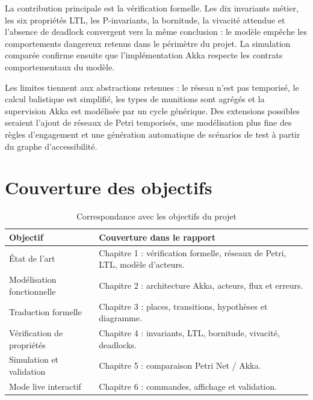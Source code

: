 \documentclass[11pt,a4paper]{report}
\begin{document}
La contribution principale est la vérification formelle. Les dix invariants métier, les six propriétés LTL, les P-invariants, la bornitude, la vivacité attendue et l'absence de deadlock convergent vers la même conclusion : le modèle empêche les comportements dangereux retenus dans le périmètre du projet. La simulation comparée confirme ensuite que l'implémentation Akka respecte les contrats comportementaux du modèle.

Les limites tiennent aux abstractions retenues : le réseau n'est pas temporisé, le calcul balistique est simplifié, les types de munitions sont agrégés et la supervision Akka est modélisée par un cycle générique. Des extensions possibles seraient l'ajout de réseaux de Petri temporisés, une modélisation plus fine des règles d'engagement et une génération automatique de scénarios de test à partir du graphe d'accessibilité.

\appendix
\chapter{Couverture des objectifs}
\begin{table}[H]
\centering
\caption{Correspondance avec les objectifs du projet}
\begin{tabularx}{\textwidth}{lY}
\toprule
Objectif & Couverture dans le rapport \\
\midrule
État de l'art & Chapitre 1 : vérification formelle, réseaux de Petri, LTL, modèle d'acteurs. \\
Modélisation fonctionnelle & Chapitre 2 : architecture Akka, acteurs, flux et erreurs. \\
Traduction formelle & Chapitre 3 : places, transitions, hypothèses et diagramme. \\
Vérification de propriétés & Chapitre 4 : invariants, LTL, bornitude, vivacité, deadlocks. \\
Simulation et validation & Chapitre 5 : comparaison Petri Net / Akka. \\
Mode live interactif & Chapitre 6 : commandes, affichage et validation. \\
\bottomrule
\end{tabularx}
\end{table}



\end{document}
